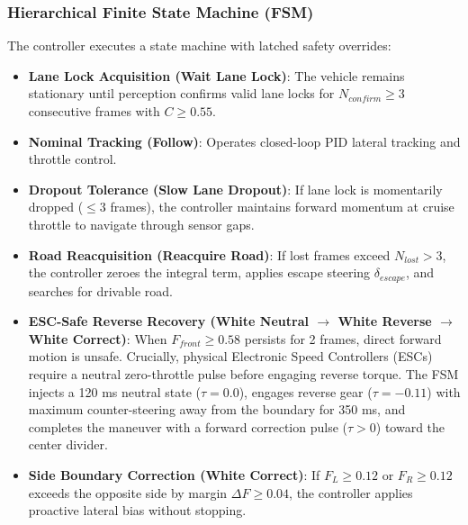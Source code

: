 \documentclass[conference]{IEEEtran}
\begin{document}
\subsubsection{Hierarchical Finite State Machine (FSM)}
The controller executes a state machine with latched safety overrides:
\begin{itemize}
    \item \textbf{Lane Lock Acquisition (Wait Lane Lock)}: The vehicle remains stationary until perception confirms valid lane locks for $N_{confirm} \ge 3$ consecutive frames with $C \ge 0.55$.
    \item \textbf{Nominal Tracking (Follow)}: Operates closed-loop PID lateral tracking and throttle control.
    \item \textbf{Dropout Tolerance (Slow Lane Dropout)}: If lane lock is momentarily dropped ($\le 3$ frames), the controller maintains forward momentum at cruise throttle to navigate through sensor gaps.
    \item \textbf{Road Reacquisition (Reacquire Road)}: If lost frames exceed $N_{lost} > 3$, the controller zeroes the integral term, applies escape steering $\delta_{escape}$, and searches for drivable road.
    \item \textbf{ESC-Safe Reverse Recovery (White Neutral $\rightarrow$ White Reverse $\rightarrow$ White Correct)}: When $F_{front} \ge 0.58$ persists for 2 frames, direct forward motion is unsafe. Crucially, physical Electronic Speed Controllers (ESCs) require a neutral zero-throttle pulse before engaging reverse torque. The FSM injects a 120 ms neutral state ($\tau = 0.0$), engages reverse gear ($\tau = -0.11$) with maximum counter-steering away from the boundary for 350 ms, and completes the maneuver with a forward correction pulse ($\tau > 0$) toward the center divider.
    \item \textbf{Side Boundary Correction (White Correct)}: If $F_L \ge 0.12$ or $F_R \ge 0.12$ exceeds the opposite side by margin $\Delta F \ge 0.04$, the controller applies proactive lateral bias without stopping.
\end{itemize}
\end{document}
